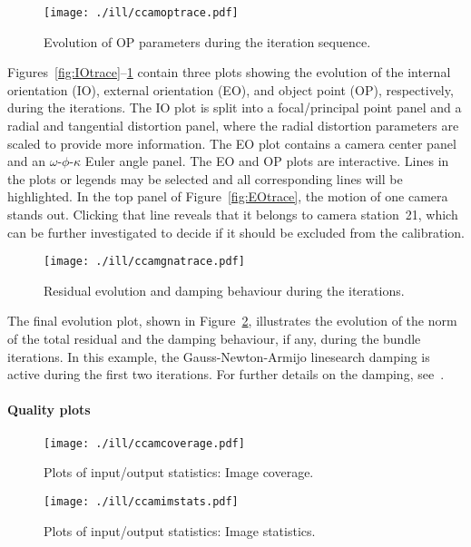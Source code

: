 \documentclass{article}
\begin{document}
\begin{figure}[tbp]
\centering
\texttt{[image: ./ill/ccamoptrace.pdf]}
\caption{\label{fig:OPtrace}Evolution of OP parameters during the iteration sequence.}
\end{figure}

Figures~\ref{fig:IOtrace}--\ref{fig:OPtrace} contain three plots showing the
evolution of the internal orientation (IO), external orientation (EO),
and object point (OP), respectively, during the iterations. The IO
plot is split into a focal/principal point panel and a radial and
tangential distortion panel, where the radial distortion parameters
are scaled to provide more information. The EO plot contains a camera
center panel and an \(\omega\)-\(\phi\)-\(\kappa\) Euler angle panel. The EO and
OP plots are interactive. Lines in the plots or legends may be
selected and all corresponding lines will be highlighted. In the top
panel of Figure~\ref{fig:EOtrace}, the motion of one camera stands out.
Clicking that line reveals that it belongs to camera station~21,
which can be further investigated to decide if it should be excluded
from the calibration.

\begin{figure}[tbp]
\centering
\texttt{[image: ./ill/ccamgnatrace.pdf]}
\caption{\label{fig:gnatrace}Residual evolution and damping behaviour during the iterations.}
\end{figure}

The final evolution plot, shown in Figure~\ref{fig:gnatrace},
illustrates the evolution of the norm of the total residual and the
damping behaviour, if any, during the bundle iterations. In this
example, the Gauss-Newton-Armijo linesearch damping is active during
the first two iterations. For further details on the damping,
see~\citet{Borlin2013:Bundle}.

\paragraph{Quality plots}
\label{sec:orgbf70475}

\begin{figure}[tbp]
\centering
\texttt{[image: ./ill/ccamcoverage.pdf]}
\caption{\label{fig:ccamCoverage}Plots of input/output statistics: Image coverage.}
\end{figure}

\begin{figure}[tbp]
\centering
\texttt{[image: ./ill/ccamimstats.pdf]}
\caption{\label{fig:ccamImstats}Plots of input/output statistics: Image statistics.}
\end{figure}
\end{document}
